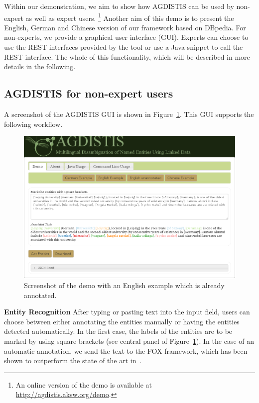 Within our demonstration, we aim to show how AGDISTIS can be used by non-expert as well as expert users. \footnote{An online version of the demo is available at \url{http://agdistis.aksw.org/demo}.}
Another aim of this demo is to present the English, German and Chinese version of our framework based on DBpedia.
For non-experts, we provide a graphical user interface (GUI).
Experts can choose to use the REST interfaces provided by the tool or use a Java snippet to call the REST interface.
The whole of this functionality, which will be described in more details in the following. %

\subsection{AGDISTIS for non-expert users}
A screenshot of the AGDISTIS GUI is shown in Figure~\ref{fig:gui}.
This GUI supports the following workflow.

\begin{figure}
\centering
\includegraphics[width=\textwidth]{part_02/unstructured_annotation/fig/GUI.png}
\caption{Screenshot of the demo with an English example which is already annotated.}
\label{fig:gui}
\end{figure}

\noindent\textbf{Entity Recognition}
After typing or pasting text into the input field, users can choose between either annotating the entities manually or having the entities detected automatically.
In the first case, the labels of the entities are to be marked by using square brackets (see central panel of Figure~\ref{fig:gui}).
In the case of an automatic annotation, we send the text to the FOX framework, which has been shown to outperform the state of the art in~\cite{FOX}.

